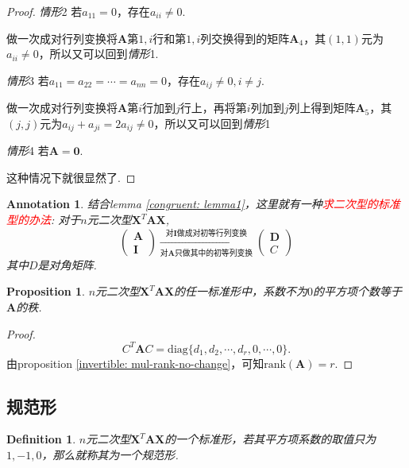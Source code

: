 \documentclass{article}
\newtheorem{proposition}[theorem]{Proposition}
\newtheorem{definition}[theorem]{Definition}
\newtheorem{annotation}[theorem]{Annotation}
\newcommand{\mbf}[1]{\bm{#1}}
\newcommand{\rank}[1]{\text{rank}\left(#1\right)} %
\newcommand{\redt}[1]{\textcolor{red}{#1}}
\begin{document}
\begin{proof}
\emph{情形}2 若$a_{11} = 0$，存在$a_{ii} \neq 0$. 

做一次成对行列变换将$\mbf{A}$第$1,i$行和第$1,i$列交换得到的矩阵$\mbf{A}_4$，其$(1,1)$元为$a_{ii} \neq 0$，所以又可以回到\emph{情形}1.

\emph{情形}3 若$a_{11} = a_{22} = \cdots = a_{nn} = 0$，存在$a_{ij} \neq 0, i \neq j$. 

做一次成对行列变换将$\mbf{A}$第$i$行加到$j$行上，再将第$i$列加到$j$列上得到矩阵$\mbf{A}_5$，其$(j,j)$元为$a_{ij} + a_{ji} = 2a_{ij} \neq 0$，所以又可以回到\emph{情形}1

\emph{情形}4 若$\mbf{A} = \mbf{0}$.

这种情况下就很显然了. 
\end{proof}

\begin{annotation}
\rm 结合lemma \ref{congruent: lemma1}，这里就有一种\redt{求二次型的标准型的办法}: 对于$n$元二次型$\mbf{X}^T\mbf{A}\mbf{X}$,
$$
\begin{pmatrix}
\mbf{A} \\
\mbf{I}
\end{pmatrix}
\xrightarrow[\text{对$\mbf{A}$只做其中的初等列变换}]{\text{对$\mbf{I}$做成对初等行列变换}}
\begin{pmatrix}
\mbf{D} \\
C
\end{pmatrix}
$$
其中$D$是对角矩阵. 
\end{annotation}

\begin{proposition}
\rm $n$元二次型$\mbf{X}^T\mbf{A}\mbf{X}$的任一标准形中，系数不为$0$的平方项个数等于$\mbf{A}$的秩.
\end{proposition}

\begin{proof}
$$
C^T\mbf{A}C = \text{diag}\{d_1,d_2,\cdots,d_r,0,\cdots,0\}.
$$
由proposition \ref{invertible: mul-rank-no-change}，可知$\rank{\mbf{A}} = r$.
\end{proof}

\newpage
\subsection{规范形}

\begin{definition}
\rm $n$元二次型$\mbf{X}^T\mbf{A}\mbf{X}$的一个标准形，若其平方项系数的取值只为$1,-1,0$，那么就称其为一个{\color{red}规范形}.
\end{definition}
\end{document}
